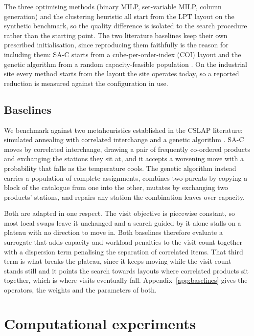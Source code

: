 \documentclass[]{interact}
\begin{document}
The three optimising methods (binary MILP, set-variable MILP, column generation) and the clustering heuristic all start from the LPT layout on the synthetic benchmark, so the quality difference is isolated to the search procedure rather than the starting point. The two literature baselines keep their own prescribed initialisation, since reproducing them faithfully is the reason for including them: SA-C starts from a cube-per-order-index (COI) layout \citep{kim2012} and the genetic algorithm from a random capacity-feasible population \citep{pan2015}. On the industrial site every method starts from the layout the site operates today, so a reported reduction is measured against the configuration in use.

\subsection{Baselines}\label{sec:baselines}
We benchmark against two metaheuristics established in the CSLAP literature: simulated annealing with correlated interchange \citep{kim2012, zhang2019cie} and a genetic algorithm \citep{pan2015}. SA-C moves by correlated interchange, drawing a pair of frequently co-ordered products and exchanging the stations they sit at, and it accepts a worsening move with a probability that falls as the temperature cools. The genetic algorithm instead carries a population of complete assignments, combines two parents by copying a block of the catalogue from one into the other, mutates by exchanging two products' stations, and repairs any station the combination leaves over capacity.

Both are adapted in one respect. The visit objective is piecewise constant, so most local swaps leave it unchanged and a search guided by it alone stalls on a plateau with no direction to move in. Both baselines therefore evaluate a surrogate that adds capacity and workload penalties to the visit count together with a dispersion term penalising the separation of correlated items. That third term is what breaks the plateau, since it keeps moving while the visit count stands still and it points the search towards layouts where correlated products sit together, which is where visits eventually fall. Appendix~\ref{app:baselines} gives the operators, the weights and the parameters of both.

\section{Computational experiments}\label{sec:experiments}
\end{document}
